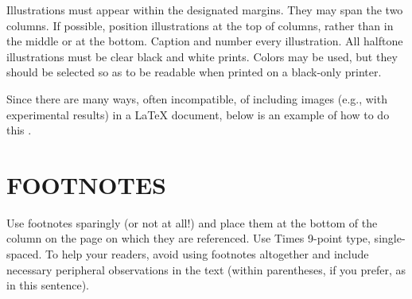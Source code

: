 \documentclass{article}
\begin{document}
Illustrations must appear within the designated margins.  They may span the two
columns.  If possible, position illustrations at the top of columns, rather
than in the middle or at the bottom.  Caption and number every illustration.
All halftone illustrations must be clear black and white prints.  Colors may be
used, but they should be selected so as to be readable when printed on a
black-only printer.

Since there are many ways, often incompatible, of including images (e.g., with
experimental results) in a LaTeX document, below is an example of how to do
this \cite{Lamp86}.

\section{FOOTNOTES}
\label{sec:foot}

Use footnotes sparingly (or not at all!) and place them at the bottom of the
column on the page on which they are referenced. Use Times 9-point type,
single-spaced. To help your readers, avoid using footnotes altogether and
include necessary peripheral observations in the text (within parentheses, if
you prefer, as in this sentence).
\end{document}
